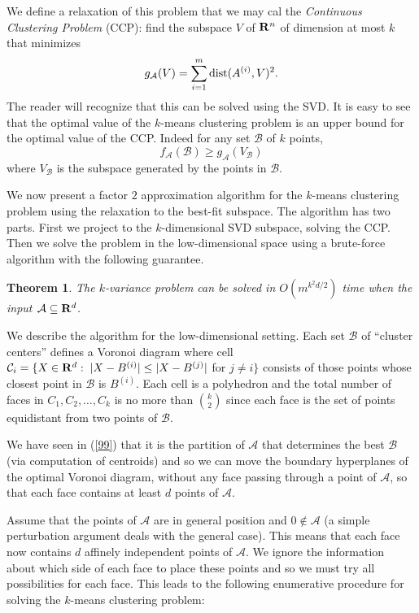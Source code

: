 \documentclass{book}
\newtheorem{theorem}{Theorem}[chapter]
\numberwithin{exercise}{chapter}
\begin{document}
We define a relaxation of this problem that we may cal the {\em Continuous Clustering Problem} (CCP): find the subspace $V$ of ${\bf R}^n$
of dimension at most $k$ that minimizes
$$g_{{\mathcal A}}(V) = \sum_{i=1}^m \hbox{dist} (A^{(i)},V)^2.$$
The reader will recognize that this can be solved using the SVD.
It is easy to see that the optimal value of the $k$-means clustering problem
 is an upper bound for
the optimal value of the CCP. Indeed for any set ${\mathcal B}$ of $k$ points,
\begin{equation}\label{100}
f_{{\mathcal A}}({\mathcal B})\geq g_{{\mathcal A}}(V_{{\mathcal B}})
\end{equation}
where $V_{{\mathcal B}}$ is the subspace generated by the points in ${\mathcal B}$.

We now present a factor $2$
approximation algorithm for the $k$-means clustering problem
using the relaxation to the best-fit subspace. The algorithm has two parts. First we project to the $k$-dimensional SVD subspace, solving the CCP. Then we solve the problem in the low-dimensional space using a brute-force algorithm with the following guarantee.

\begin{theorem}
The $k$-variance problem can be solved
in $O(m^{k^2d/2})$ time when the input
${\mathcal A}\subseteq {\bf R}^d$.
\end{theorem}

We describe the algorithm for the low-dimensional setting.
Each set ${\mathcal B}$ of ``cluster centers'' defines a Voronoi diagram where cell
${\mathcal C}_i=\{X\in {\bf R}^d:\;|X-B^{(i)}|\leq |X-B^{(j)}|$ for $j\neq i\}$ consists of those points
whose closest point in ${\mathcal B}$ is $B^{(i)}$. Each cell is a polyhedron and the total number of faces in
$C_1,C_2,\ldots,C_k$ is no more than $\binom{k}{2}$ since each face is the set of points equidistant from
two points of ${\mathcal B}$.

We have seen in (\ref{99}) that it is the partition of ${\mathcal A}$ that determines the best ${\mathcal B}$ (via
computation of centroids) and so we can move the boundary hyperplanes of the optimal Voronoi diagram, without any face passing through a
point of ${\mathcal A}$,
so that each face contains at least $d$ points of ${\mathcal A}$.

Assume that the points of ${\mathcal A}$ are in general position and $0\notin {\mathcal A}$ (a simple perturbation
argument deals with the general case). This means that each face now contains $d$ affinely independent
points of ${\mathcal A}$. We ignore the information about which side of each face to place these points and
so we must try all possibilities for each face. This leads to the following enumerative procedure for
solving the $k$-means clustering problem:\\
\end{document}
